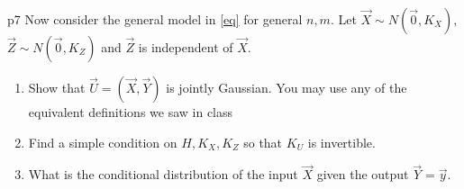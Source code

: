\documentclass[a4paper, 11pt]{article}
\begin{document}
\begin{problem}{%
	}{p7%
	}
Now consider the general model in \eqref{eq} for general $n,m$. Let $\vec{X}\sim N(\vec{0}, K_X)$, $\vec{Z}\sim N(\vec{0},K_Z)$ and $\vec{Z}$ is independent of $\vec{X}$.
\begin{enumerate}[label=(\alph*)]
	\item Show that $\vec{U}=(\vec{X},\vec{Y})$ is jointly Gaussian. You may use any of the equivalent definitions we saw in class
	\item Find a simple condition on $H,K_X,K_Z$ so that $K_U$ is invertible.
	\item What is the conditional distribution of the input $\vec{X}$ given the output $\vec{Y}=\vec{y}$.
\end{enumerate}
\end{problem}
\solve{
}
\end{document}
